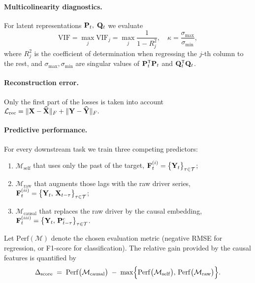 \documentclass[14pt]{extarticle}
\begin{document}
	\paragraph{Multicolinearity diagnostics.}
	For latent representations  $\mathbf{P}_t, \; \mathbf{Q}_t$
	we evaluate 
	\[
	\text{VIF} = \max_{j} \text{VIF}_j = \max_{j}\frac{1}{1-R_j^{2}},
	\quad
	\kappa = \frac{\sigma_{\max}}{\sigma_{\min}},
	\]
	where $R_j^{2}$ is the coefficient of determination when
	regressing the $j$-th column to the rest,
	and $\sigma_{\max},\sigma_{\min}$ are singular values
	of $\mathbf{P}_t^{\mathsf{T}} \mathbf{P}_t$ and $\mathbf{Q}_t^{\mathsf{T}} \mathbf{Q}_t$.
	
	\paragraph{Reconstruction error.}
	Only the first part of the losses is taken into account
	\(
	\mathcal L_{\mathrm{rec}}
	=
	\Vert\mathbf{X}-\widehat{\mathbf{X}}\Vert_F
	+
	\Vert\mathbf{Y}-\widehat{\mathbf{Y}}\Vert_F .
	\)
	
	\paragraph{Predictive performance.}
	For every downstream task we train three competing predictors:
	
	\begin{enumerate}[label=(\roman*),nosep,leftmargin=1.4cm]
		\item \( \mathcal{M}_{\mathrm{self}} \) that uses only the past of the target,  
		\( \mathbf{F}^{(i)}_t = \bigl\{ \mathbf{Y}_{t}\bigr\}_{\tau\in\mathcal{T}} \);
		\item \( \mathcal{M}_{\mathrm{raw}} \) that augments those lags with the raw driver series,  
		\( \mathbf{F}^{(ii)}_t = \bigl\{ \mathbf{Y}_{t},\,\mathbf{X}_{t-\tau}\bigr\}_{\tau\in\mathcal{T}} \);
		\item \( \mathcal{M}_{\mathrm{causal}} \) that replaces the raw driver by the causal embedding,  
		\( \mathbf{F}^{(iii)}_t = \bigl\{ \mathbf{Y}_{t},\,\mathbf{P}_{t-\tau}^{\mathrm c}\bigr\}_{\tau\in\mathcal{T}} \).
	\end{enumerate}
	
	Let \(\mathrm{Perf}(\mathcal{M})\) denote the chosen evaluation metric  
	(negative RMSE for regression, or F1-score for classification).  
	The relative gain provided by the causal features is quantified by
	\[
	\Delta_{\text{score}}
	\;=\;
	\mathrm{Perf}\bigl(\mathcal{M}_{\mathrm{causal}}\bigr)
	\;-\;
	\max\Bigl\{
	\mathrm{Perf}\bigl(\mathcal{M}_{\mathrm{self}}\bigr),\,
	\mathrm{Perf}\bigl(\mathcal{M}_{\mathrm{raw}}\bigr)
	\Bigr\}.
	\]
	
\end{document}
